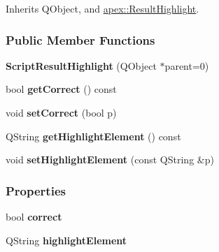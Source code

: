 \hypertarget{classapex_1_1data_1_1_script_result_highlight}{
\label{classapex_1_1data_1_1_script_result_highlight}
}


Inherits Q\-Object, and \hyperlink{classapex_1_1_result_highlight}{apex\-::\-Result\-Highlight}.

\subsubsection*{Public Member Functions}
\begin{DoxyCompactItemize}
\item
\hypertarget{classapex_1_1data_1_1_script_result_highlight_a530377428cd5183ce80c41f2d0f88e75}{{\bfseries Script\-Result\-Highlight} (Q\-Object $\ast$parent=0)}\label{classapex_1_1data_1_1_script_result_highlight_a530377428cd5183ce80c41f2d0f88e75}

\item
\hypertarget{classapex_1_1data_1_1_script_result_highlight_a1836a17efca7630a6eea8b79692837ac}{bool {\bfseries get\-Correct} () const }\label{classapex_1_1data_1_1_script_result_highlight_a1836a17efca7630a6eea8b79692837ac}

\item
\hypertarget{classapex_1_1data_1_1_script_result_highlight_a87e7493d15dec46d521a2d19adf0f69e}{void {\bfseries set\-Correct} (bool p)}\label{classapex_1_1data_1_1_script_result_highlight_a87e7493d15dec46d521a2d19adf0f69e}

\item
\hypertarget{classapex_1_1data_1_1_script_result_highlight_ae6635f0cdb5979b4fac230327d680bdc}{Q\-String {\bfseries get\-Highlight\-Element} () const }\label{classapex_1_1data_1_1_script_result_highlight_ae6635f0cdb5979b4fac230327d680bdc}

\item
\hypertarget{classapex_1_1data_1_1_script_result_highlight_a5df8a62cdeb085636d84fa08d9d646c2}{void {\bfseries set\-Highlight\-Element} (const Q\-String \&p)}\label{classapex_1_1data_1_1_script_result_highlight_a5df8a62cdeb085636d84fa08d9d646c2}

\end{DoxyCompactItemize}
\subsubsection*{Properties}
\begin{DoxyCompactItemize}
\item
\hypertarget{classapex_1_1data_1_1_script_result_highlight_a94d0ea78eaaad9e96075d29905bc249e}{bool {\bfseries correct}}\label{classapex_1_1data_1_1_script_result_highlight_a94d0ea78eaaad9e96075d29905bc249e}

\item
\hypertarget{classapex_1_1data_1_1_script_result_highlight_a813a7bad78993601c9d737dc21f9e908}{Q\-String {\bfseries highlight\-Element}}\label{classapex_1_1data_1_1_script_result_highlight_a813a7bad78993601c9d737dc21f9e908}

\end{DoxyCompactItemize}
